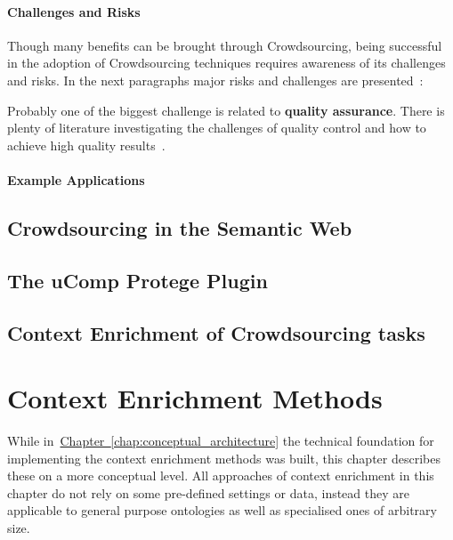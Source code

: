 \documentclass[draft,final]{vutinfth} %
\begin{document}
\subsubsection{Challenges and Risks}
Though many benefits can be brought through Crowdsourcing, being successful in the adoption of Crowdsourcing techniques requires awareness of its challenges and risks. In the next paragraphs major risks and challenges are presented~\cite{hossfeld2013}:

Probably one of the biggest challenge is related to \textbf{quality assurance}. There is plenty of literature investigating the challenges of quality control and how to achieve high quality results~\cite{allahbakhsh2013, daniel2018, hansen2013, hsueh2009}. 


\subsubsection{Example Applications}


\section{Crowdsourcing in the Semantic Web}
\section{The uComp Protege Plugin}\label{sec:ucomp_protege_plugin}
\section{Context Enrichment of Crowdsourcing tasks}



\chapter{Context Enrichment Methods}\label{chap:context_enrichment_methods}
While in~\hyperref[chap:conceptual_architecture]{Chapter~\ref*{chap:conceptual_architecture}} the technical foundation for implementing the context enrichment methods was built, this chapter describes these on a more conceptual level. All approaches of context enrichment in this chapter do not rely on some pre-defined settings or data, instead they are applicable to general purpose ontologies as well as specialised ones of arbitrary size.
\end{document}

